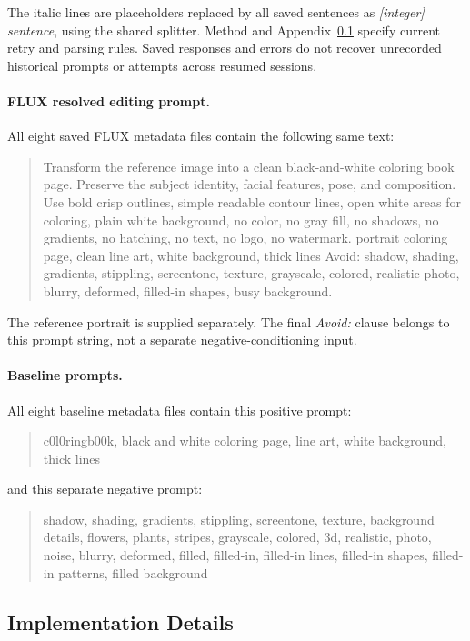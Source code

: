 The italic lines are placeholders replaced by all saved sentences as \emph{[integer] sentence}, using the shared splitter. Method and Appendix~\ref{app:implementation-details} specify current retry and parsing rules. Saved responses and errors do not recover unrecorded historical prompts or attempts across resumed sessions.

\paragraph{FLUX resolved editing prompt.}
All eight saved FLUX metadata files contain the following same text:
\begin{quote}\small
Transform the reference image into a clean black-and-white coloring book page. Preserve the subject identity, facial features, pose, and composition. Use bold crisp outlines, simple readable contour lines, open white areas for coloring, plain white background, no color, no gray fill, no shadows, no gradients, no hatching, no text, no logo, no watermark. portrait coloring page, clean line art, white background, thick lines Avoid: shadow, shading, gradients, stippling, screentone, texture, grayscale, colored, realistic photo, blurry, deformed, filled-in shapes, busy background.
\end{quote}
The reference portrait is supplied separately. The final \emph{Avoid:} clause belongs to this prompt string, not a separate negative-conditioning input.

\paragraph{Baseline prompts.}
All eight baseline metadata files contain this positive prompt:
\begin{quote}\small
c0l0ringb00k, black and white coloring page, line art, white background, thick lines
\end{quote}
and this separate negative prompt:
\begin{quote}\small
shadow, shading, gradients, stippling, screentone, texture, background details, flowers, plants, stripes, grayscale, colored, 3d, realistic, photo, noise, blurry, deformed, filled, filled-in, filled-in lines, filled-in shapes, filled-in patterns, filled background
\end{quote}

\subsection{Implementation Details}
\label{app:implementation-details}

